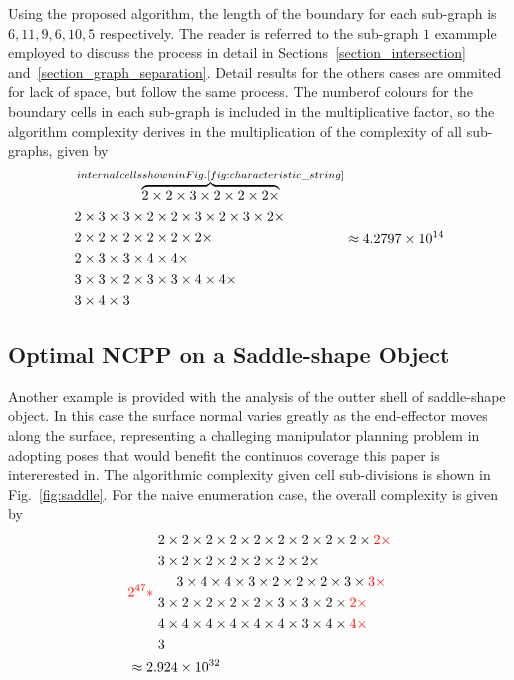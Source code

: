 \documentclass[conference]{IEEEtran}
\begin{document}
Using the proposed algorithm, the length of the boundary for each sub-graph is $6, 11, 9, 6, 10, 5$ respectively. The reader is referred to the sub-graph $1$  exammple
employed to discuss the process in detail in Sections~\ref{section_intersection} and~\ref{section_graph_separation}. Detail results for the others cases are ommited for lack of space, 
but follow the same process. 
The numberof colours for the boundary cells in each sub-graph is included in the multiplicative factor, so the algorithm complexity derives in the multiplication of 
the complexity of all sub-graphs, given by 
\begin{equation}
\begin{aligned}
&\overbrace{2\times2\times3\times2\times2\times2\times}^{\mbox{internal cells shown in Fig.\ref{fig:characteristic_string}}}\\
&2\times3\times3\times2\times2\times3\times2\times3\times2\times\\
&2\times2\times2\times2\times2\times2\times\\
&2\times3\times3\times4\times4\times\\
&3\times3\times2\times3\times3\times4\times4\times\\
&3\times4\times3
\end{aligned} \approx 4.2797\times10^{14}
\end{equation}

\subsection{Optimal NCPP on a Saddle-shape Object}
Another example is provided with the analysis of the outter shell of saddle-shape object. In this case the surface normal varies greatly as the end-effector moves 
along the surface, representing a challeging manipulator planning problem in adopting poses that would benefit the continuos coverage this paper is intererested in. 
The algorithmic complexity given cell sub-divisions is shown in Fig.~\ref{fig:saddle}. For the  naive enumeration case, the overall complexity is given by 
\begin{equation}
\begin{aligned}
&{\color{red}2^{47}*}~
\begin{aligned}
&2\times2\times2\times2\times2\times2\times2\times2\times2\times{\color{red}2\times}\\
&3\times2\times2\times2\times2\times2\times2\times \\
&~~~~3\times4\times4\times3\times2\times2\times2\times3\times{\color{red}3\times}\\
&3\times2\times2\times2\times2\times3\times3\times2\times{\color{red}2\times}\\
&4\times4\times4\times4\times4\times4\times3\times4\times{\color{red}4\times}\\
&3
\end{aligned}\\
&\approx 2.924\times10^{32}
\end{aligned}
\end{equation}
\end{document}
